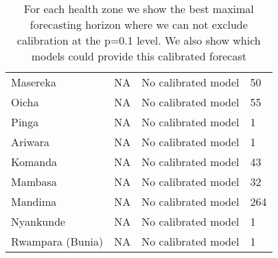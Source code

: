 \begin{table}[h!]
\begin{tabular}{|l|l|p{8cm}|l|}
  Masereka & NA & No calibrated model & 50 \\ 
  Oicha & NA & No calibrated model & 55 \\ 
  Pinga & NA & No calibrated model & 1 \\ 
  Ariwara & NA & No calibrated model & 1 \\ 
  Komanda & NA & No calibrated model & 43 \\ 
  Mambasa & NA & No calibrated model & 32 \\ 
  Mandima & NA & No calibrated model & 264 \\ 
  Nyankunde & NA & No calibrated model & 1 \\ 
  Rwampara (Bunia) & NA & No calibrated model & 1 \\ 
   \hline
\end{tabular}
\caption{For each health zone we show the best maximal forecasting horizon where we can not exclude calibration at the p=0.1 level. We also show which models could provide this calibrated forecast} 
\label{tab:best_model}
\end{table}
